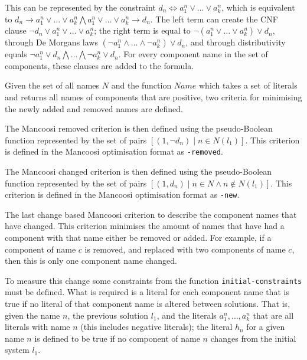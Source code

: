This can be represented by the constraint $d_n \Leftrightarrow a^n_1 \vee \ldots \vee a^n_k$, which
is equivalent to $d_n \rightarrow a^n_1 \vee \ldots \vee a^n_k \bigwedge a^n_1 \vee \ldots \vee a^n_k \rightarrow d_n$.
The left term can create the CNF clause $\neg d_n \vee a^n_1 \vee \ldots \vee a^n_k$;
the right term is equal to $\neg(a^n_1 \vee \ldots \vee a^n_k) \vee d_n$,
through De Morgans laws $(\neg a^n_1 \wedge \ldots \wedge \neg a^n_k) \vee d_n$,
and through distributivity equals $\neg a^n_1 \vee d_n \bigwedge \ldots \bigwedge \neg a^n_k \vee d_n$.      
For every component name in the set of components, these clauses are added to the formula.


Given the set of all names $N$ and the function $Name$ which takes a set of literals and returns all names of components that are positive,
two criteria for minimising the newly added and removed names are defined.
\begin{defs}
The Mancoosi removed criterion is then defined using the pseudo-Boolean function
represented by the set of pairs $[(1,\neg d_n) \mid n \in N(l_1)]$.
This criterion is defined in the Mancoosi optimisation format as \verb+-removed+.
\end{defs}

\begin{defs}
The Mancoosi changed criterion is then defined using the pseudo-Boolean function
 represented by the set of pairs $[(1,d_n) \mid n \in N \wedge n \not \in N(l_1)]$.
This criterion is defined in the Mancoosi optimisation format as \verb+-new+.
\end{defs}

The last change based Mancoosi criterion to describe the component names that have changed.
This criterion minimises the amount of names that have had a component with that name either be removed or added.
For example, if a component of name $c$ is removed, and replaced with two components of name $c$, then this is only one component name changed.

To measure this change some constraints from the function \verb+initial-constraints+ must be defined.
What is required is a literal for each component name that is true if no literal of that component name is altered between solutions.
That is, given the name $n$, the previous solution $l_1$, and the literals $a^n_1, \ldots , a^n_k$ that are all literals with name $n$ (this includes negative literals);
the literal $h_n$ for a given name $n$ is defined to be true if no component of name $n$ changes from the initial system $l_1$.

